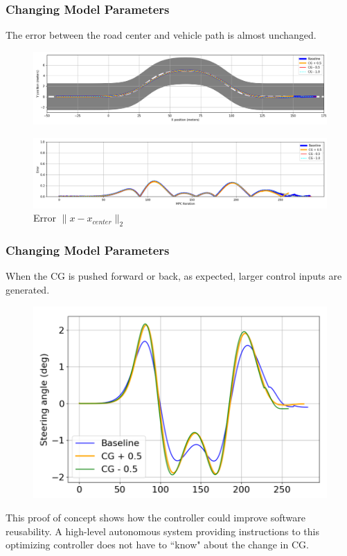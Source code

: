\documentclass{beamer}
\begin{document}
\begin{frame}
\frametitle{Changing Model Parameters}

The error between the road center and vehicle path is almost unchanged.

\vspace{-0.5em}
\begin{figure}
	\centering
	\includegraphics[width=1.0\linewidth]{figures/road_paths_cg.png}
\end{figure}


\vspace{-1.5em}
\begin{figure}
	\centering
	\includegraphics[width=1.0\linewidth]{figures/errors_cg.png}
	\caption{Error $\|x-x_{center}\|_2$}
\end{figure}
\end{frame}

\begin{frame}
\frametitle{Changing Model Parameters}

When the CG is pushed forward or back, as expected, larger control inputs are generated.

\vspace{-0.5em}
\begin{figure}
	\includegraphics[width=0.65\linewidth]{figures/steering_angle_cg.png}
\end{figure}
\vspace{-0.5em}

This proof of concept shows how the controller could improve software reusability. A high-level autonomous system providing instructions to this optimizing controller does not have to ``know" about the change in CG.
\end{frame}
\end{document}
